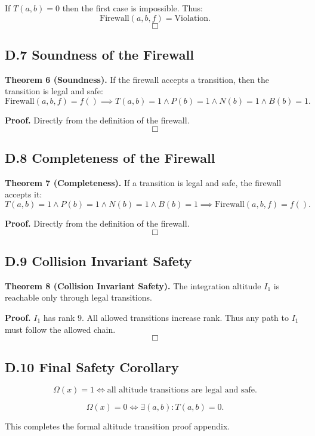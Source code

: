 If $T(a,b)=0$ then the first case is impossible.  
Thus:
\[
\mathrm{Firewall}(a,b,f) = \mathrm{Violation}.
\]
\[
\Box
\]

\subsection*{D.7 Soundness of the Firewall}

\textbf{Theorem 6 (Soundness).}  
If the firewall accepts a transition, then the transition is legal and safe:
\[
\mathrm{Firewall}(a,b,f)=f() \implies
T(a,b)=1 \land P(b)=1 \land N(b)=1 \land B(b)=1.
\]

\textbf{Proof.}  
Directly from the definition of the firewall.  
\[
\Box
\]

\subsection*{D.8 Completeness of the Firewall}

\textbf{Theorem 7 (Completeness).}  
If a transition is legal and safe, the firewall accepts it:
\[
T(a,b)=1 \land P(b)=1 \land N(b)=1 \land B(b)=1
\implies
\mathrm{Firewall}(a,b,f)=f().
\]

\textbf{Proof.}  
Directly from the definition of the firewall.  
\[
\Box
\]

\subsection*{D.9 Collision Invariant Safety}

\textbf{Theorem 8 (Collision Invariant Safety).}  
The integration altitude $I_1$ is reachable only through legal transitions.

\textbf{Proof.}  
$I_1$ has rank $9$.  
All allowed transitions increase rank.  
Thus any path to $I_1$ must follow the allowed chain.  
\[
\Box
\]

\subsection*{D.10 Final Safety Corollary}

\[
\Omega(x)=1 \iff \text{all altitude transitions are legal and safe}.
\]

\[
\Omega(x)=0 \iff \exists (a,b) : T(a,b)=0.
\]

This completes the formal altitude transition proof appendix.
